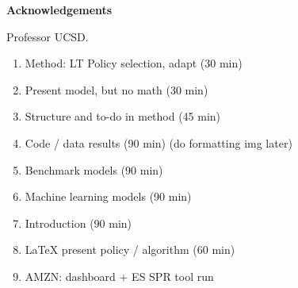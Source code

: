 \documentclass[../../main.tex]{subfiles}
\begin{document}
\thispagestyle{empty}
\newenvironment{acknowledgements}%
    {\cleardoublepage\thispagestyle{empty}\null\vfill\begin{center}%
    \vspace{0pt}
    \bfseries Acknowledgements\end{center}}%
    {\vfill\null}
        \begin{acknowledgements}

Professor UCSD.
\begin{enumerate}
\item Method: LT Policy selection, adapt (30 min)
\item Present model, but no math (30 min)
\item Structure and to-do in method (45 min)
\item Code / data results (90 min) (do formatting img later)
\item Benchmark models (90 min)
\item Machine learning models (90 min)
\item Introduction (90 min)
\item LaTeX present policy / algorithm (60 min)
\item AMZN: dashboard + ES SPR tool run
\end{enumerate}



        \end{acknowledgements}
\end{document}
